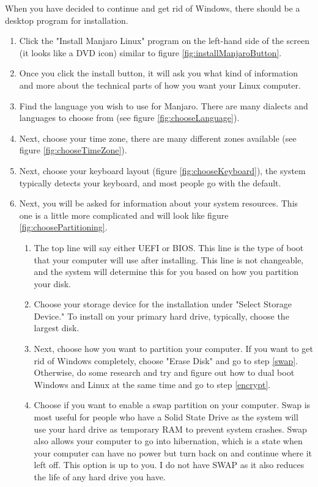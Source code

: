 \documentclass{article}
\begin{document}
When you have decided to continue and get rid of Windows, there should be a desktop program for installation.
\begin{enumerate}
    \item Click the "Install Manjaro Linux" program on the left-hand side of the screen (it looks like a DVD icon) similar to figure \ref{fig:installManjaroButton}.
    \item Once you click the install button, it will ask you what kind of information and more about the technical parts of how you want your Linux computer. 
    \item Find the language you wish to use for Manjaro. There are many dialects and languages to choose from (see figure \ref{fig:chooseLanguage}).
    \item Next, choose your time zone, there are many different zones available (see figure \ref{fig:chooseTimeZone}).
    \item Next, choose your keyboard layout (figure \ref{fig:chooseKeyboard}), the system typically detects your keyboard, and most people go with the default.
    \item Next, you will be asked for information about your system resources. This one is a little more complicated and will look like figure \ref{fig:choosePartitioning}.
    \begin{enumerate}\label{partitions}
        \item The top line will say either UEFI or BIOS. This line is the type of boot that your computer will use after installing. This line is not changeable, and the system will determine this for you based on how you partition your disk.
        \item Choose your storage device for the installation under "Select Storage Device." To install on your primary hard drive, typically, choose the largest disk. 
        \item Next, choose how you want to partition your computer. If you want to get rid of Windows completely, choose "Erase Disk" and go to step \ref{swap}. Otherwise, do some research and try and figure out how to dual boot Windows and Linux at the same time and go to step \ref{encrypt}.
        \item\label{swap} Choose if you want to enable a swap partition on your computer. Swap is most useful for people who have a Solid State Drive as the system will use your hard drive as temporary RAM to prevent system crashes. Swap also allows your computer to go into hibernation, which is a state when your computer can have no power but turn back on and continue where it left off. This option is up to you. I do not have SWAP as it also reduces the life of any hard drive you have. 

\end{enumerate}
\end{enumerate}
\end{document}
